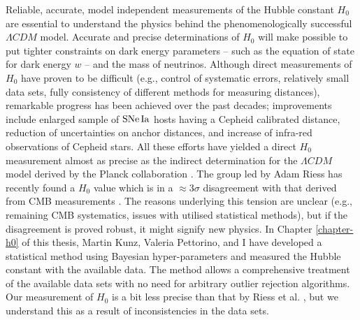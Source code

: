 Reliable, accurate, model independent measurements of the Hubble constant $H_0$ are essential to understand the physics behind the phenomenologically successful $\Lambda CDM$ model. Accurate and precise determinations of $H_0$ will make possible to put tighter constraints on dark energy parameters -- such as the equation of state for dark energy $w$ -- and the mass of neutrinos. Although direct measurements of $H_0$ have proven to be difficult (e.g., control of systematic errors, relatively small data sets, fully consistency of different methods for measuring distances), remarkable progress has been achieved over the past decades; improvements include enlarged sample of $\mathrm{SNe\,Ia}$ hosts having a Cepheid calibrated distance, reduction of uncertainties on anchor distances, and increase of infra-red observations of Cepheid stars. All these efforts have yielded a direct $H_0$ measurement almost as precise as the indirect determination for the $\Lambda CDM$ model derived by the Planck collaboration \cite{Ade:2015xua,Riess:2016jrr}. The group led by Adam Riess has recently found a $H_0$ value which is in a $\approx 3\sigma$ disagreement with that derived from CMB measurements \cite{Riess:2016jrr}. The reasons underlying this tension are unclear (e.g., remaining CMB systematics, issues with utilised statistical methods), but if the disagreement is proved robust, it might signify new physics.  In Chapter \ref{chapter-h0} of this thesis, Martin Kunz, Valeria Pettorino, and I have developed a statistical method using Bayesian hyper-parameters and measured the Hubble constant with the available data. The method allows a comprehensive treatment of the available data sets with no need for arbitrary outlier rejection algorithms. Our measurement of $H_0$ is a bit less precise than that by Riess et al. \cite{Riess:2016jrr}, but we understand this as a result of inconsistencies in the data sets. 